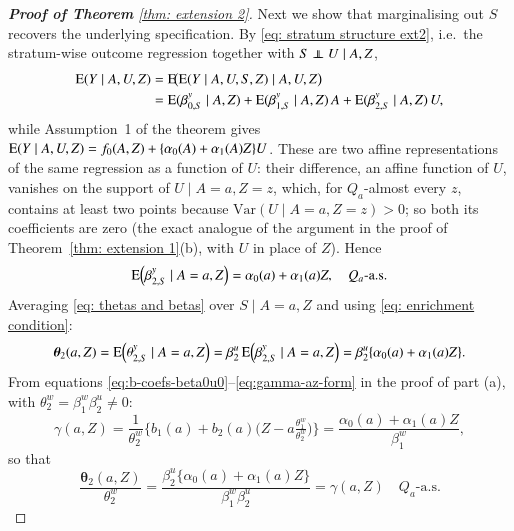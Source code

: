 \begin{proof}[\hypertarget{proof of thm extension 2}{\textbf{Proof of Theorem}} \ref{thm: extension 2}]
Next we show that marginalising out $S$ recovers the underlying specification. By \eqref{eq: stratum structure ext2}, i.e.\ the stratum-wise outcome regression together with $S \independent U \mid A,Z$,
\begin{align*}
\mathrm{E}(Y\mid A,U,Z)
&=\mathrm{E}\!\big(\mathrm{E}(Y\mid A,U,S,Z)\mid A,U,Z\big) \\
&=\mathrm{E}(\beta_{0,S}^{y}\mid A,Z)+\mathrm{E}(\beta_{1,S}^{y}\mid A,Z)\,A+\mathrm{E}(\beta_{2,S}^{y}\mid A,Z)\,U,
\end{align*}
while Assumption~1 of the theorem gives $\mathrm{E}(Y\mid A,U,Z)=f_0(A,Z)+\{\alpha_0(A)+\alpha_1(A)Z\}U$. These are two affine representations of the same regression as a function of $U$: their difference, an affine function of $U$, vanishes on the support of $U \mid A=a,Z=z$, which, for $Q_a$-almost every $z$, contains at least two points because $\mathrm{Var}(U\mid A=a,Z=z)>0$; so both its coefficients are zero (the exact analogue of the argument in the proof of Theorem~\ref{thm: extension 1}(b), with $U$ in place of $Z$). Hence
\begin{equation}\label{eq: enrichment condition}
\mathrm{E}\!\left(\beta_{2,S}^{y}\mid A=a,Z\right)=\alpha_0(a)+\alpha_1(a)Z,\quad Q_a\text{-a.s.}
\end{equation}
Averaging \eqref{eq: thetas and betas} over $S\mid A=a,Z$ and using \eqref{eq: enrichment condition}:
\[
\boldsymbol{\theta}_2(a,Z)
=\mathrm{E}\!\left(\theta_{2,S}^y\mid A=a,Z\right)
=\beta_2^u\,\mathrm{E}\!\left(\beta_{2,S}^y\mid A=a,Z\right)
=\beta_2^u\{\alpha_0(a)+\alpha_1(a)Z\}.
\]
From equations \eqref{eq:b-coefs-beta0u0}--\eqref{eq:gamma-az-form} in the proof of part (a), with $\theta_2^w=\beta_1^w\beta_2^u\neq 0$:
\[
\gamma(a,Z)
=\frac{1}{\theta_2^w}\bigl\{b_1(a)+b_2(a)\bigl(Z-a\tfrac{\theta_1^w}{\theta_2^w}\bigr)\bigr\}
=\frac{\alpha_0(a)+\alpha_1(a)Z}{\beta_1^w},
\]
so that
\[
\frac{\boldsymbol{\theta}_2(a,Z)}{\theta_2^w}
=\frac{\beta_2^u\{\alpha_0(a)+\alpha_1(a)Z\}}{\beta_1^w\beta_2^u}
=\gamma(a,Z)\quad Q_a\text{-a.s.}
\]


\end{proof}
